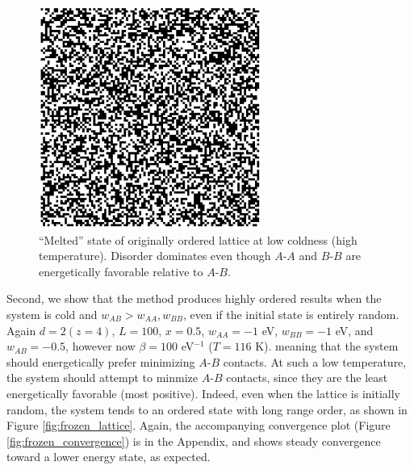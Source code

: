 \documentclass[10pt]{article}
\begin{document}
\begin{figure}[h!]
\centering
\includegraphics[width=0.65\textwidth]{Figures/verification_melted_lattice.png}
\caption{``Melted'' state of originally ordered lattice at low coldness (high temperature).
Disorder dominates even though $A$-$A$ and $B$-$B$ are energetically favorable relative to $A$-$B$.}
\label{fig:melted_lattice}
\end{figure}

Second, we show that the method produces highly ordered results when the system is cold and $w_{AB} > w_{AA},w_{BB}$, even if the initial state is entirely random.
Again $d=2 (z=4)$, $L=100$, $x=0.5$,  $w_{AA}=-1$ eV, $w_{BB} = -1$ eV, and $w_{AB} = -0.5$, however now $\beta = 100$ eV$^{-1}$ ($T=116$ K). meaning that the system should energetically prefer minimizing $A$-$B$ contacts.
At such a low temperature, the system should attempt to minmize $A$-$B$ contacts, since they are the least energetically favorable (most positive).
Indeed, even when the lattice is initially random, the system tends to an ordered state with long range order, as shown in Figure \ref{fig:frozen_lattice}.
Again, the accompanying convergence plot (Figure \ref{fig:frozen_convergence}) is in the Appendix, and shows steady convergence toward a lower energy state, as expected.
\end{document}
